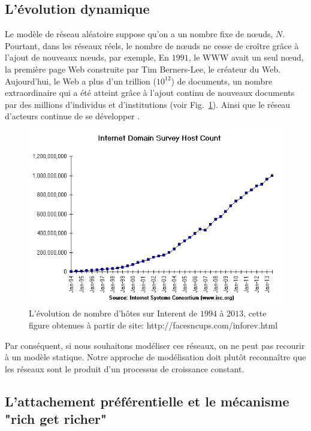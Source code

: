 \subsection{L'évolution dynamique}
Le modèle de réseau aléatoire suppose qu'on a un nombre fixe de nœuds, $N$. Pourtant, dans les réseaux réels, le nombre de nœuds ne cesse de croître grâce à l'ajout de nouveaux nœuds, par exemple, En $1991$, le WWW avait un seul nœud, la première page Web construite par Tim Berners-Lee, le créateur du Web. Aujourd'hui, le Web a plus d'un trillion ($10^{12}$) de documents, un nombre extraordinaire qui a été atteint grâce à l'ajout continu de nouveaux documents par des millions d'individus et d'institutions (voir Fig.~\ref{hosts}). Ainsi que le réseau d'acteurs continue de se développer \cite{Barabasi2015}.
\begin{figure}[h]
	\centering
	\includegraphics[scale=0.5]{./figures/hosts}
	\caption{L'évolution de nombre d'hôtes sur Interent de $1994$ à $2013$, cette figure  obtenues à partir de site: http://facesncups.com/inforev.html}
	\label{hosts}
\end{figure}
Par conséquent, si nous souhaitons modéliser ces réseaux, on ne peut pas recourir à un modèle statique. Notre approche de modélisation doit plutôt reconnaître que les réseaux sont le produit d'un processus de croissance constant.
\begin{sloppypar}
\subsection{L'attachement préférentielle et le mécanisme "rich get richer"}
\end{sloppypar}
